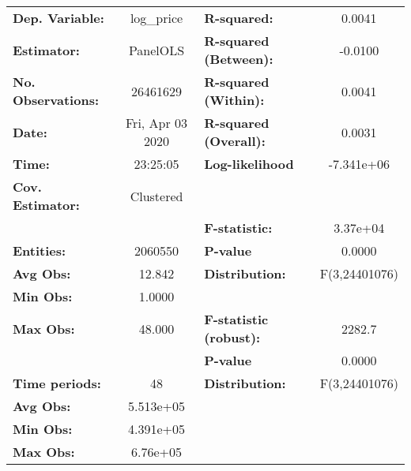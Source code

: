 \documentclass{report}
\begin{document}
\begin{center}
\begin{tabular}{lclc}
\toprule
\textbf{Dep. Variable:}      &     log\_price     & \textbf{  R-squared:         }   &      0.0041      \\
\textbf{Estimator:}          &      PanelOLS      & \textbf{  R-squared (Between):}  &     -0.0100      \\
\textbf{No. Observations:}   &      26461629      & \textbf{  R-squared (Within):}   &      0.0041      \\
\textbf{Date:}               &  Fri, Apr 03 2020  & \textbf{  R-squared (Overall):}  &      0.0031      \\
\textbf{Time:}               &      23:25:05      & \textbf{  Log-likelihood     }   &    -7.341e+06    \\
\textbf{Cov. Estimator:}     &     Clustered      & \textbf{                     }   &                  \\
\textbf{}                    &                    & \textbf{  F-statistic:       }   &     3.37e+04     \\
\textbf{Entities:}           &      2060550       & \textbf{  P-value            }   &      0.0000      \\
\textbf{Avg Obs:}            &       12.842       & \textbf{  Distribution:      }   &  F(3,24401076)   \\
\textbf{Min Obs:}            &       1.0000       & \textbf{                     }   &                  \\
\textbf{Max Obs:}            &       48.000       & \textbf{  F-statistic (robust):} &      2282.7      \\
\textbf{}                    &                    & \textbf{  P-value            }   &      0.0000      \\
\textbf{Time periods:}       &         48         & \textbf{  Distribution:      }   &  F(3,24401076)   \\
\textbf{Avg Obs:}            &     5.513e+05      & \textbf{                     }   &                  \\
\textbf{Min Obs:}            &     4.391e+05      & \textbf{                     }   &                  \\
\textbf{Max Obs:}            &      6.76e+05      & \textbf{                     }   &                  \\
\bottomrule
\end{tabular}
\begin{tabular}{lcccccc}

\end{tabular}
\end{center}
\end{document}
